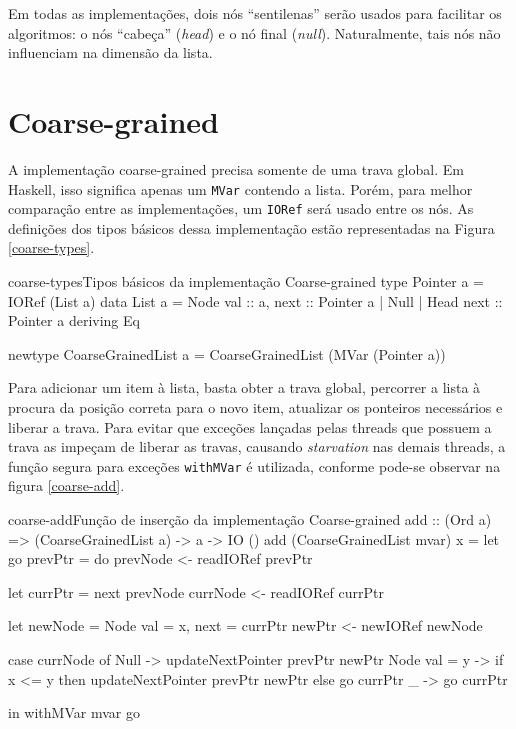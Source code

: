 \documentclass[a4paper,12pt,oldfontcommands]{abntex2}
\begin{document}
Em todas as implementações, dois nós ``sentilenas'' serão usados para facilitar os algoritmos: o nós ``cabeça'' (\textit{head}) e o nó final (\textit{null}). Naturalmente, tais nós não influenciam na dimensão da lista.

\section{Coarse-grained}

A  implementação coarse-grained precisa somente de uma trava global. Em Haskell, isso significa apenas um \texttt{MVar} contendo a lista. Porém, para melhor comparação entre as implementações, um \texttt{IORef} será usado entre os nós. As definições dos tipos básicos dessa implementação estão representadas na Figura \ref{coarse-types}.

\begin{code}{coarse-types}{Tipos básicos da implementação Coarse-grained}
type Pointer a = IORef (List a)
data List a = Node { val :: a, next :: Pointer a }
    | Null
    | Head { next :: Pointer a }
    deriving Eq

newtype CoarseGrainedList a = CoarseGrainedList (MVar (Pointer a))
\end{code}

Para adicionar um item à lista, basta obter a trava global, percorrer a lista à procura da posição correta para o novo item, atualizar os ponteiros necessários e liberar a trava. Para evitar que exceções lançadas pelas threads que possuem a trava as impeçam de liberar as travas, causando \textit{starvation} nas demais threads, a função segura para exceções \texttt{withMVar} é utilizada, conforme pode-se observar na figura \ref{coarse-add}.

\begin{code}{coarse-add}{Função de inserção da implementação Coarse-grained}
add :: (Ord a) => (CoarseGrainedList a) -> a -> IO ()
add (CoarseGrainedList mvar) x =
    let
        go prevPtr = do
            prevNode <- readIORef prevPtr

            let currPtr = next prevNode
            currNode <- readIORef currPtr

            let newNode = Node { val = x, next = currPtr }
            newPtr <- newIORef newNode

            case currNode of
                Null -> updateNextPointer prevPtr newPtr
                Node { val = y } ->
                    if x <= y then updateNextPointer prevPtr newPtr
                    else go currPtr
                _ -> go currPtr

    in withMVar mvar go
\end{code}
\end{document}
